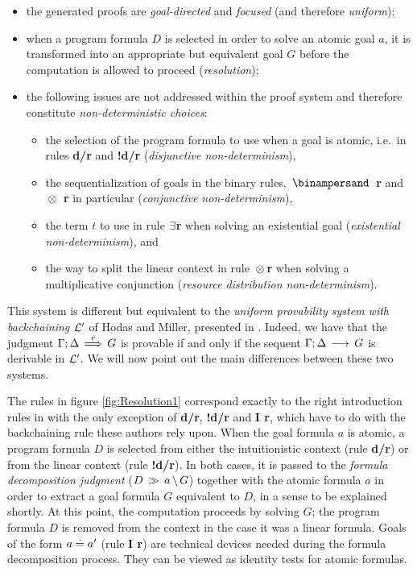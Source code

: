 \begin{itemize}
\item
  the generated proofs are {\em goal-directed\/} and {\em focused\/} (and
  therefore {\em uniform\/});
\item
  when a program formula $D$ is selected in order to solve an atomic goal
  $a$, it is transformed into an appropriate but equivalent goal $G$
  before the computation is allowed to proceed ({\em resolution\/});
\item
  the following issues are not addressed within the proof system and
  therefore constitute {\em non-deterministic choices\/}:
  \begin{itemize}
  \item
    the selection of the program formula to use when a goal is atomic, i.e.\
    in rules {\bf d/r} and {\bf !d/r} ({\em disjunctive non-determinism\/}),
  \item 
    the sequentialization of goals in the binary rules, {\bf $\With$ r} and
    {\bf $\, \otimes \,$ r} in particular ({\em conjunctive non-determinism\/}),
  \item
    the term $t$ to use in rule {\bf $\exists$r} when solving an existential
    goal ({\em existential non-determinism\/}), and
  \item
    the way to split the linear context in rule {\bf $\, \otimes \,$r} when
    solving a multiplicative conjunction ({\em resource distribution
      non-determinism\/}).
  \end{itemize}
\end{itemize}

This system is different but equivalent to the {\em uniform provability
  system with backchaining\/} ${\cal L}'$ of Hodas and Miller, presented in
\cite{HoM94}. Indeed, we have that the judgment $\Gamma;\Delta \, \stackrel{r}{\Longrightarrow} \, G$ is provable
if and only if the sequent $\Gamma;\Delta\,\longrightarrow\,G$ is derivable in ${\cal
  L}'$. We will now point out the main differences between these two systems.

The rules in figure \ref{fig:Resolution1} correspond exactly to the right
introduction rules in \cite{HoM94} with the only exception of {\bf d/r}, {\bf
  !d/r} and {\bf I r}, which have to do with the backchaining rule these
authors rely upon. When the goal formula $a$ is atomic, a program formula $D$
is selected from either the intuitionistic context (rule {\bf d/r}) or from
the linear context (rule {\bf !d/r}). In both cases, it is passed to the {\em
  formula decomposition judgment\/} ($D \, \gg \, a \, \backslash \, G$) together with the
atomic formula $a$ in order to extract a goal formula $G$ equivalent to $D$,
in a sense to be explained shortly. At this point, the computation proceeds
by solving $G$; the program formula $D$ is removed from the context in the
case it was a linear formula. Goals of the form $a \stackrel{.}{=} a'$ (rule {\bf I r})
are technical devices needed during the formula decomposition process. They
can be viewed as identity tests for atomic formulas.

